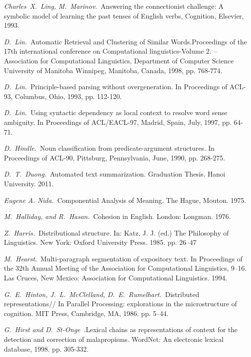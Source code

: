 \documentclass{article}
\begin{document}
\begin{articletext}
\begin{thebibliography}{9}
\textit{Charles~X.~Ling, M.~Marinov.~}Answering the connectionist challenge: A symbolic model of learning the past tenses of English verbs,  Cognition, Elsevier, 1993.

\textit{D.~Lin.~}Automatic Retrieval and Clustering of Similar Words.Proceedings of the 17th international conference on Computational linguistics-Volume 2. – Association for Computational Linguistics, Department of Computer Science University of Manitoba Winnipeg, Manitoba, Canada, 1998, pp. 768-774.

\textit{D.~Lin.~}Principle-based parsing without overgeneration. In Proceedings of ACL-93, Columbus, Ohio, 1993, pp. 112-120.

\textit{D.~Lin.~}Using syntactic dependency as local context to resolve word sense ambiguity. In Proceedings of ACL/EACL-97, Madrid, Spain, July, 1997, pp. 64-71.

\textit{D.~Hindle.~}Noun classification from predicate-argument structures. In Proceedings of ACL-90, Pittsburg, Pennsylvania, June, 1990, pp. 268-275.

\textit{D.~T.~Duong.~}Automated text summarization. Graduation Thesis. Hanoi University. 2011. 

\textit{Eugene A. Nida.~}Componential Analysis of Meaning. The Hague, Mouton. 1975. 

\textit{M.~Halliday, and R.~Hasan.~}Cohesion in English. London: Longman. 1976. 

\textit{Z.~Harris.~}Distributional structure. In: Katz, J. J. (ed.) The Philosophy of Linguistics. New York: Oxford University Press. 1985. pp. 26–47

\textit{M.~Hearst.~}Multi-paragraph segmentation of expository text. In Proceedings of the 32th Annual Meeting of the Association for Computational Linguistics, 9–16. Las Cruces, New Mexico: Association for Computational Linguistics. 1994. 

\textit{G.~E.~Hinton, J.~L.~McClelland, D.~E.~Rumelhart.~}Distributed representations// In Parallel Processing: explorations in the microstructure of cognition. MIT Press, Cambridge, MA, 1986. pp. 5–44.

\textit{G.~Hirst and D.~St-Onge~.}Lexical chains as representations of context for the detection and correction of malapropisms. WordNet: An electronic lexical database, 1998. pp. 305-332.


\end{thebibliography}
\end{articletext}
\end{document}
